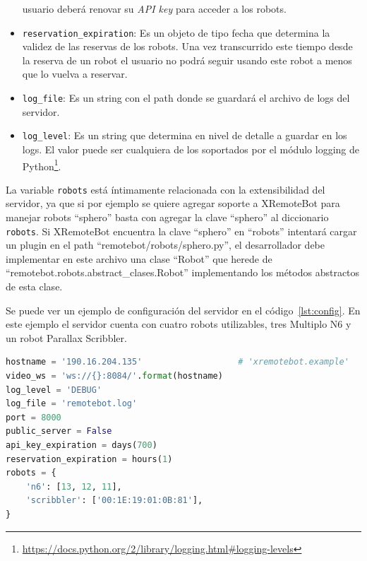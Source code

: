 \begin{itemize}
        usuario deberá renovar su \textit{API key} para acceder
        a los robots.
    \item \texttt{reservation\_expiration}: Es un objeto de tipo
        fecha que determina la validez de las reservas de los robots.
        Una vez transcurrido este tiempo desde la reserva de un robot
        el usuario no podrá seguir usando este robot a menos que lo
        vuelva a reservar.
    \item \texttt{log\_file}: Es un string con el path donde se
        guardará el archivo de logs del servidor.
    \item \texttt{log\_level}: Es un string que determina en nivel
        de detalle a guardar en los logs. El valor puede ser
        cualquiera de los soportados por el módulo logging de
        Python\footnote{\url{https://docs.python.org/2/library/logging.html\#logging-levels}}.
\end{itemize}

La variable \texttt{robots} está íntimamente
relacionada con la extensibilidad del servidor, ya que si por ejemplo
se quiere agregar soporte a XRemoteBot para manejar robots ``sphero''
basta con agregar la clave ``sphero'' al diccionario
\texttt{robots}. Si XRemoteBot encuentra la clave ``sphero'' en ``robots''
intentará cargar un plugin en el path
``remotebot/robots/sphero.py'',
el desarrollador debe implementar en este archivo una clase ``Robot''
que herede de ``remotebot.robots.abstract\_clases.Robot'' implementando
los métodos abstractos de esta clase.

Se puede ver un ejemplo de configuración del servidor en el
código~\ref{lst:config}. En este ejemplo el servidor cuenta
con cuatro robots utilizables, tres Multiplo N6 y un robot
Parallax Scribbler.

\begin{lstlisting}[language=python,
    caption={Configuración de ejemplo de XRemoteBot en
    \texttt{configuration.py}},
    label=lst:config]
hostname = '190.16.204.135'                   # 'xremotebot.example'
video_ws = 'ws://{}:8084/'.format(hostname)
log_level = 'DEBUG'
log_file = 'remotebot.log'
port = 8000
public_server = False
api_key_expiration = days(700)
reservation_expiration = hours(1)
robots = {
    'n6': [13, 12, 11],
    'scribbler': ['00:1E:19:01:0B:81'],
}
\end{lstlisting}

